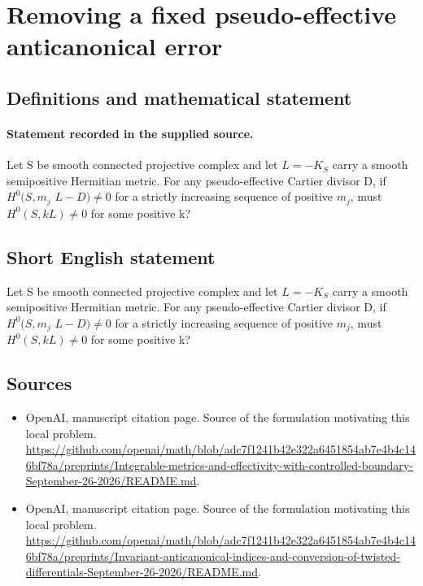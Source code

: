 \documentclass[11pt]{article}
\begin{document}
\section*{Removing a fixed pseudo-effective anticanonical error}\label{statement}
\subsection{Definitions and mathematical statement}
\paragraph{Statement recorded in the supplied source.}
Let S be smooth connected projective complex and let $L=-K_S$ carry a smooth semipositive Hermitian metric. For any pseudo-effective Cartier divisor D, if $H^{0}(S,m_j$ $L-D)\neq 0$ for a strictly increasing sequence of positive $m_j$, must $H^{0}(S,kL)\neq 0$ for some positive k?
\subsection{Short English statement}
Let S be smooth connected projective complex and let $L=-K_S$ carry a smooth semipositive Hermitian metric. For any pseudo-effective Cartier divisor D, if $H^{0}(S,m_j$ $L-D)\neq 0$ for a strictly increasing sequence of positive $m_j$, must $H^{0}(S,kL)\neq 0$ for some positive k?
\subsection{Sources}
\begin{itemize}
\item[S1] OpenAI, manuscript citation page. Source of the formulation motivating this local problem.
\url{https://github.com/openai/math/blob/adc7f1241b42e322a6451854ab7e4b4c146bf78a/preprints/Integrable-metrics-and-effectivity-with-controlled-boundary-September-26-2026/README.md}.
\item[S2] OpenAI, manuscript citation page. Source of the formulation motivating this local problem.
\url{https://github.com/openai/math/blob/adc7f1241b42e322a6451854ab7e4b4c146bf78a/preprints/Invariant-anticanonical-indices-and-conversion-of-twisted-differentials-September-26-2026/README.md}.
\end{itemize}
\end{document}
